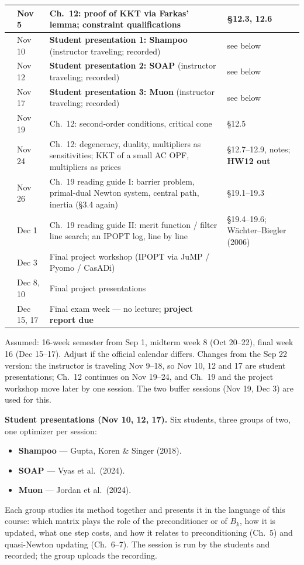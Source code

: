 \documentclass[10pt,a4paper]{article}
\newcommand{\hw}[1]{\textbf{#1}}
\begin{document}
\begin{longtable}{@{}>{\raggedright\arraybackslash}p{7mm}>{\raggedright\arraybackslash}p{18mm}>{\raggedright\arraybackslash}p{86mm}>{\raggedright\arraybackslash}p{47mm}@{}}
 & Nov 5 & Ch.~12: proof of KKT via Farkas' lemma; constraint qualifications & \S12.3, 12.6\\
\midrule
11 & Nov 10 & \textbf{Student presentation 1: Shampoo} (instructor traveling; recorded) & see below\\
 & Nov 12 & \textbf{Student presentation 2: SOAP} (instructor traveling; recorded) & see below\\
12 & Nov 17 & \textbf{Student presentation 3: Muon} (instructor traveling; recorded) & see below\\
 & Nov 19 & Ch.~12: second-order conditions, critical cone & \S12.5\\
13 & Nov 24 & Ch.~12: degeneracy, duality, multipliers as sensitivities; KKT of a small AC OPF,
  multipliers as prices & \S12.7--12.9, notes; \hw{HW12 out}\\
 & Nov 26 & Ch.~19 reading guide I: barrier problem, primal-dual Newton system, central path,
  inertia (\S3.4 again) & \S19.1--19.3\\
14 & Dec 1 & Ch.~19 reading guide II: merit function / filter line search; an IPOPT log, line by line
  & \S19.4--19.6; W\"achter--Biegler (2006)\\
 & Dec 3 & Final project workshop (IPOPT via JuMP / Pyomo / CasADi) & \\
15 & Dec 8, 10 & Final project presentations & \\
16 & Dec 15, 17 & Final exam week --- no lecture; \textbf{project report due} & \\
\bottomrule
\end{longtable}

{\small Assumed: 16-week semester from Sep 1, midterm week 8 (Oct 20--22), final week 16 (Dec 15--17).
Adjust if the official calendar differs. Changes from the Sep 22 version: the instructor is traveling
Nov 9--18, so Nov 10, 12 and 17 are student presentations; Ch.~12 continues on Nov 19--24, and Ch.~19 and the
project workshop move later by one session. The two buffer sessions (Nov 19, Dec 3) are used for this.}

\textbf{Student presentations (Nov 10, 12, 17).} Six students, three groups of two, one optimizer per session:
\begin{itemize}[leftmargin=*,itemsep=0.1em]
  \item \textbf{Shampoo} --- Gupta, Koren \& Singer (2018).
  \item \textbf{SOAP} --- Vyas et al.\ (2024).
  \item \textbf{Muon} --- Jordan et al.\ (2024).
\end{itemize}
Each group studies its method together and presents it in the language of this course: which matrix plays the
role of the preconditioner or of $B_k$, how it is updated, what one step costs, and how it relates to
preconditioning (Ch.~5) and quasi-Newton updating (Ch.~6--7). The session is run by the students and
recorded; the group uploads the recording.
\end{document}
